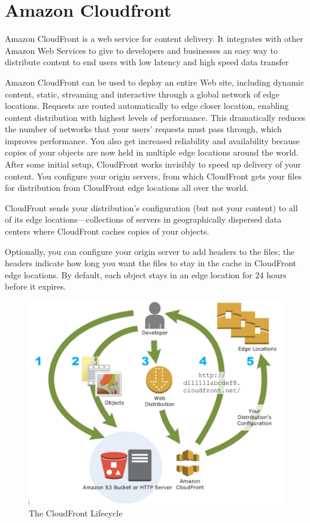 \section{Amazon Cloudfront}
\label{sec:Amazon Cloudfront}

Amazon CloudFront is a web service for content delivery. It integrates with other Amazon Web Services to give to developers and businesses an easy way to distribute content to end users with low latency and high speed data transfer

Amazon CloudFront can be used to deploy an entire Web site, including dynamic content, static, streaming and interactive through a global network of edge locations. Requests are routed automatically to edge closer location, enabling content distribution with highest levels of performance.
This dramatically reduces the number of networks that your users' requests must pass through, which improves performance.
You also get increased reliability and availability because copies of your objects are now held in multiple edge locations around the world.
After some initial setup, CloudFront works invisibly to speed up delivery of your content.
You configure your origin servers, from which CloudFront gets your files for distribution from CloudFront edge locations all over the world.

CloudFront sends your distribution's configuration (but not your content) to all of its edge locations—collections of servers in geographically dispersed data centers where CloudFront caches copies of your objects.

Optionally, you can configure your origin server to add headers to the files; the headers indicate how long you want the files to stay in the cache in CloudFront edge locations. By default, each object stays in an edge location for 24 hours before it expires.



\begin{figure}[htb] %
 \centering
 \includegraphics[width=1.0\linewidth]{images/chapter2/cloudfront.png}\hfill
 \caption[The CloudFront Lifecycle]{The CloudFront Lifecycle}
 \label{fig:fourV}
\end{figure}

